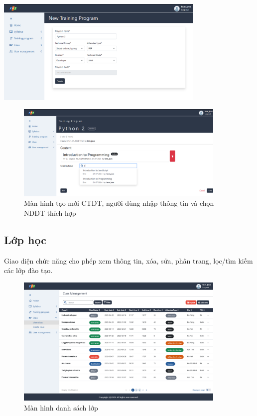 \documentclass[report.tex]{subfiles}
\begin{document}
{\centering
\includegraphics[width=380px]{../meta/ui.program-create-1.png}
\par
}
\begin{figure}[!htb]
{\centering
\includegraphics[width=380px]{../meta/ui.program-create-2.png}
\caption[Màn hình tạo mới CTDT]{Màn hình tạo mới CTDT, người dùng nhập thông tin và chọn NDDT thích hợp}
\par
}
\end{figure}
\FloatBarrier

\subsection{Lớp học}

Giao diện chức năng cho phép xem thông tin, xóa, sửa, phân trang, lọc/tìm kiếm các lớp đào tạo.

\begin{figure}[!htb]
{\centering
\includegraphics[width=380px]{../meta/ui.class-list.png}
\caption{Màn hình danh sách lớp}
\par
}
\end{figure}
\FloatBarrier
\end{document}
